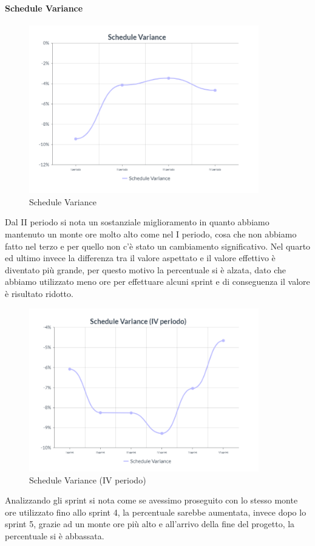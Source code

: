 \paragraph{Schedule Variance}
\begin{center}
\begin{figure}[H]
  \centering
  \renewcommand{\thefigure}{9}
  \includegraphics[width=10cm]{./res/images/SVGraph.png}
  \caption{Schedule Variance}
  \label{fig:Grafico Schedule Variance}
\end{figure}
\end{center}
Dal II periodo si nota un sostanziale miglioramento in quanto abbiamo mantenuto un monte ore molto alto come nel I periodo, cosa che non abbiamo fatto nel terzo e per quello non c'è stato un cambiamento significativo. Nel quarto ed ultimo invece la differenza tra il valore aspettato e il valore effettivo è diventato più grande, per questo motivo la percentuale si è alzata, dato che abbiamo utilizzato meno ore per effettuare alcuni sprint e di conseguenza il valore è risultato ridotto.
\begin{center}
\begin{figure}[H]
  \centering
  \renewcommand{\thefigure}{10}
  \includegraphics[width=10cm]{./res/images/SVGraphSprint.png}
  \caption{Schedule Variance (IV periodo)}
  \label{fig:Grafico Schedule Variance (IV periodo)}
\end{figure}
\end{center}
Analizzando gli sprint si nota come se avessimo proseguito con lo stesso monte ore utilizzato fino allo sprint 4, la percentuale sarebbe aumentata, invece dopo lo sprint 5, grazie ad un monte ore più alto e all'arrivo della fine del progetto, la percentuale si è abbassata.

